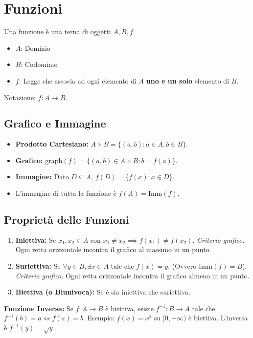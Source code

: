 \documentclass{article}
\begin{document}
\section*{Funzioni}
Una funzione è una terna di oggetti $A, B, f$.
\begin{itemize}
    \item $A$: Dominio
    \item $B$: Codominio
    \item $f$: Legge che associa ad ogni elemento di $A$ \textbf{uno e un solo} elemento di $B$.
\end{itemize}
Notazione: $f: A \to B$.

\subsection*{Grafico e Immagine}
\begin{itemize}
    \item \textbf{Prodotto Cartesiano:} $A \times B = \{ (a,b) : a \in A, b \in B \}$.
    \item \textbf{Grafico:} $\text{graph}(f) = \{ (a,b) \in A \times B : b = f(a) \}$.
    \item \textbf{Immagine:} Dato $D \subseteq A$, $f(D) = \{ f(x) : x \in D \}$.
    \item L'immagine di tutta la funzione è $f(A) = \text{Imm}(f)$.
\end{itemize}

\subsection*{Proprietà delle Funzioni}
\begin{enumerate}
    \item \textbf{Iniettiva:} Se $x_1, x_2 \in A$ con $x_1 \neq x_2 \implies f(x_1) \neq f(x_2)$.
    \textit{Criterio grafico:} Ogni retta orizzontale incontra il grafico al massimo in un punto.
    \item \textbf{Suriettiva:} Se $\forall y \in B, \exists x \in A$ tale che $f(x) = y$. (Ovvero $\text{Imm}(f) = B$).
    \textit{Criterio grafico:} Ogni retta orizzontale incontra il grafico almeno in un punto.
    \item \textbf{Biettiva (o Biunivoca):} Se è sia iniettiva che suriettiva.
\end{enumerate}

\textbf{Funzione Inversa:}
Se $f: A \to B$ è biettiva, esiste $f^{-1}: B \to A$ tale che $f^{-1}(b) = a \iff f(a) = b$.
Esempio: $f(x) = x^2$ su $[0, +\infty)$ è biettiva. L'inversa è $f^{-1}(y) = \sqrt{y}$.
\end{document}
